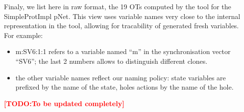 \documentclass{lmcs}
\newcommand{\TODO}[1]{\textcolor{red}{\textbf{[TODO:#1]}}}
\begin{document}

Finaly, we list here in raw format, the 19 OTs computed by the tool for the SimpleProtImpl pNet.
This view uses variable names very close to the internal representation in the tool, allowing for tracability of generated fresh variables. For example:
\begin{itemize}
\item m:SV6:1:1 refers to a variable named ``m'' in the synchronisation vector ``SV6''; the last 2 numbers allows to distinguish different clones.
\item the other variable names reflect our naming policy: state variables are prefixed by the name of the state, holes actions by the name of the hole.
\end{itemize}

\TODO{To be updated completely}
\end{document}
